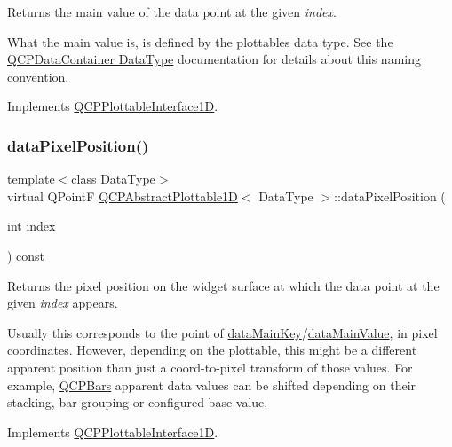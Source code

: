 Returns the main value of the data point at the given {\itshape index}.

What the main value is, is defined by the plottable\textquotesingle{}s data type. See the \hyperlink{class_q_c_p_data_container_qcpdatacontainer-datatype}{Q\+C\+P\+Data\+Container Data\+Type} documentation for details about this naming convention. 

Implements \hyperlink{class_q_c_p_plottable_interface1_d_af6330919e8023277d08c958a6074fc76}{Q\+C\+P\+Plottable\+Interface1D}.

\mbox{\label{class_q_c_p_abstract_plottable1_d_abc363be6268d4547aa5324cb88138f30}} 
\subsubsection{\texorpdfstring{data\+Pixel\+Position()}{dataPixelPosition()}\hspace{0.1cm}{\footnotesize\ttfamily [1/2]}}
{\footnotesize\ttfamily template$<$class Data\+Type$>$ \\
virtual Q\+PointF \hyperlink{class_q_c_p_abstract_plottable1_d}{Q\+C\+P\+Abstract\+Plottable1D}$<$ Data\+Type $>$\+::data\+Pixel\+Position (\begin{DoxyParamCaption}\item[{int}]{index }\end{DoxyParamCaption}) const\hspace{0.3cm}{\ttfamily [virtual]}}

Returns the pixel position on the widget surface at which the data point at the given {\itshape index} appears.

Usually this corresponds to the point of \hyperlink{class_q_c_p_abstract_plottable1_d_ab14ab428595856bf76e04499017fa8dc}{data\+Main\+Key}/\hyperlink{class_q_c_p_abstract_plottable1_d_a0f913bb0889ca7cb574657a078fc8cff}{data\+Main\+Value}, in pixel coordinates. However, depending on the plottable, this might be a different apparent position than just a coord-\/to-\/pixel transform of those values. For example, \hyperlink{class_q_c_p_bars}{Q\+C\+P\+Bars} apparent data values can be shifted depending on their stacking, bar grouping or configured base value. 

Implements \hyperlink{class_q_c_p_plottable_interface1_d_a78911838cfbcfd2d8df9ad2fdbfb8e93}{Q\+C\+P\+Plottable\+Interface1D}.



